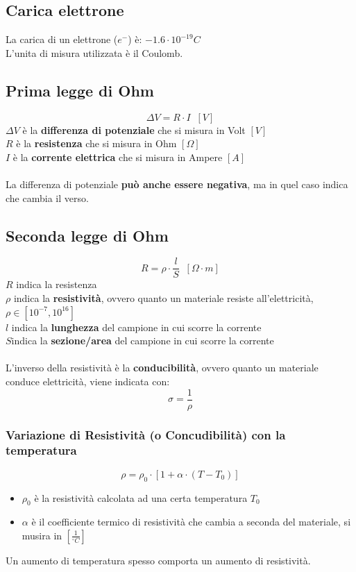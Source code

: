 \documentclass[../main.tex]{subfiles}
\begin{document}
	\subsection{Carica elettrone}
	La carica di un elettrone ($e^-$) è: $-1.6 \cdot 10^{-19} C$ \\
	L'unita di misura utilizzata è il Coulomb.
	
	\subsection{Prima legge di Ohm}
	\begin{equation}
		\Delta V = R \cdot I \;\; [V]
	\end{equation}
	$\Delta V$ è la \textbf{differenza di potenziale} che si misura in Volt $[V]$ \\
	$R$ è la \textbf{resistenza} che si misura in Ohm $[\Omega]$ \\
	$I$ è la \textbf{corrente elettrica} che si misura in Ampere $[A]$\\\\
	La differenza di potenziale \textbf{può anche essere negativa}, ma in quel caso indica che cambia il verso.
	\subsection{Seconda legge di Ohm}
	\begin{equation}
		R = \rho \cdot \frac{l}{S} \;\; [\Omega \cdot m]
	\end{equation}
	$R$ indica la resistenza \\
	$\rho$ indica la \textbf{resistività}, ovvero quanto un materiale resiste all'elettricità, $\rho \in \left[ 10^{-7}, 10^{16}\right]$ \\
	$l$ indica la \textbf{lunghezza} del campione in cui scorre la corrente \\
	$S$indica la \textbf{sezione/area} del campione in cui scorre la corrente \\ \\
	L'inverso della resistività è la \textbf{conducibilità}, ovvero quanto un materiale conduce elettricità, viene indicata con:
	\[ \sigma = \frac{1}{\rho} \]
	\subsubsection{Variazione di Resistività (o Concudibilità) con la temperatura}
	\begin{equation}
		\rho = \rho_0 \cdot \left[ 1 + \alpha \cdot (T - T_0)\right]
	\end{equation}
	\begin{itemize}
		\item $\rho_0$ è la resistività calcolata ad una certa temperatura $T_0$
		\item $\alpha$ è il coefficiente termico di resistività che cambia a seconda del materiale, si musira in $\left[ \frac{1}{ ^\circ C}\right]$
	\end{itemize}
	Un aumento di temperatura spesso comporta un aumento di resistività.
\end{document}
